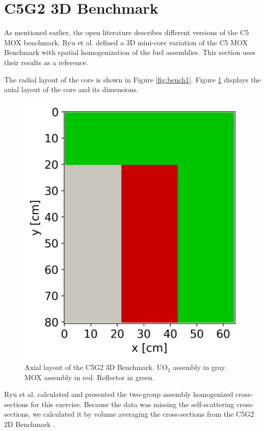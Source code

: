 \documentclass{anstrans}
\begin{document}


\section{C5G2 3D Benchmark}

As mentioned earlier, the open literature describes different versions of the C5 MOX benchmark.
Ryu et al. \cite{ryu_finite_2013} defined a 3D mini-core variation of the C5 MOX Benchmark with spatial homogenization of the fuel assemblies.
This section uses their results as a reference.

The radial layout of the core is shown in Figure \ref{fig:bench1}.
Figure \ref{fig:c5g2-3d} displays the axial layout of the core and its dimensions.

\begin{figure}[h] %
    \centering
    \includegraphics[width=0.4\linewidth]{figures/geo-xz2.png}
    \hfill
    \caption{Axial layout of the C5G2 3D Benchmark. UO$_2$ assembly in gray. MOX assembly in red. Reflector in green.}
    \label{fig:c5g2-3d}
\end{figure}

Ryu et al. calculated and presented the two-group assembly homogenized cross-sections for this exercise.
Because the data was missing the self-scattering cross-sections, we calculated it by volume averaging the cross-sections from the C5G2 2D Benchmark \cite{cavarec_benchmark_1994}.
\end{document}
